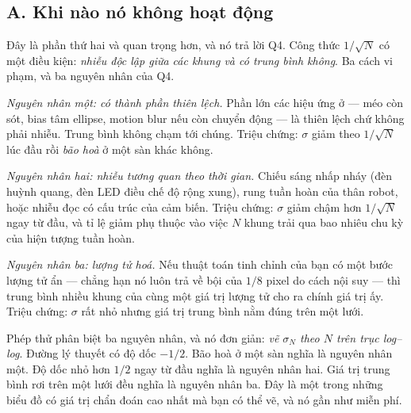 \documentclass[../../marker.tex]{subfiles}
\begin{document}
\subsection{A. Khi nào nó không hoạt động}

Đây là phần thứ hai và quan trọng hơn, và nó trả lời Q4. Công thức \(1/\sqrt{N}\) có một điều kiện: \emph{nhiễu độc lập giữa các khung và có trung bình không}. Ba cách vi phạm, và ba nguyên nhân của Q4.

\emph{Nguyên nhân một: có thành phần thiên lệch.} Phần lớn các hiệu ứng ở  --- méo còn sót, bias tâm ellipse, motion blur nếu còn chuyển động --- là thiên lệch chứ không phải nhiễu. Trung bình không chạm tới chúng. Triệu chứng: \(\sigma\) giảm theo \(1/\sqrt{N}\) lúc đầu rồi \emph{bão hoà} ở một sàn khác không.

\emph{Nguyên nhân hai: nhiễu tương quan theo thời gian.} Chiếu sáng nhấp nháy (đèn huỳnh quang, đèn LED điều chế độ rộng xung), rung tuần hoàn của thân robot, hoặc nhiễu đọc có cấu trúc của cảm biến. Triệu chứng: \(\sigma\) giảm chậm hơn \(1/\sqrt{N}\) ngay từ đầu, và tỉ lệ giảm phụ thuộc vào việc \(N\) khung trải qua bao nhiêu chu kỳ của hiện tượng tuần hoàn.

\emph{Nguyên nhân ba: lượng tử hoá.} Nếu thuật toán tinh chỉnh của bạn có một bước lượng tử ẩn --- chẳng hạn nó luôn trả về bội của \(1/8\) pixel do cách nội suy --- thì trung bình nhiều khung của cùng một giá trị lượng tử cho ra chính giá trị ấy. Triệu chứng: \(\sigma\) rất nhỏ nhưng giá trị trung bình nằm đúng trên một lưới.

Phép thử phân biệt ba nguyên nhân, và nó đơn giản: \emph{vẽ \(\sigma_N\) theo \(N\) trên trục log--log}. Đường lý thuyết có độ dốc \(-1/2\). Bão hoà ở một sàn nghĩa là nguyên nhân một. Độ dốc nhỏ hơn \(1/2\) ngay từ đầu nghĩa là nguyên nhân hai. Giá trị trung bình rơi trên một lưới đều nghĩa là nguyên nhân ba. Đây là một trong những biểu đồ có giá trị chẩn đoán cao nhất mà bạn có thể vẽ, và nó gần như miễn phí.
\end{document}
